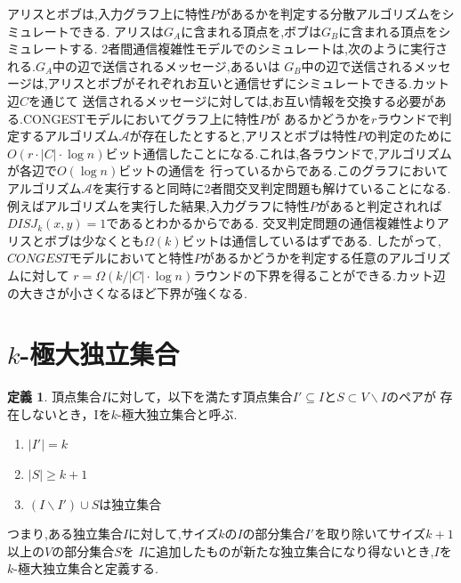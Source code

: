 \documentclass[12pt]{thesis}
\newcommand{\CONGEST}{\textsf{CONGEST}}
\theoremstyle{definition}
\newtheorem{definition}{定義}[chapter]
\begin{document}
アリスとボブは,入力グラフ上に特性$P$があるかを判定する分散アルゴリズムをシミュレートできる.
アリスは$G_{A}$に含まれる頂点を,ボブは$G_{B}$に含まれる頂点をシミュレートする.
2者間通信複雑性モデルでのシミュレートは,次のように実行される.$G_{A}$中の辺で送信されるメッセージ,あるいは
$G_{B}$中の辺で送信されるメッセージは,アリスとボブがそれぞれお互いと通信せずにシミュレートできる.カット辺$C$を通じて
送信されるメッセージに対しては,お互い情報を交換する必要がある.{\CONGEST}モデルにおいてグラフ上に特性$P$が
あるかどうかを$r$ラウンドで判定するアルゴリズム$\mathcal{A}$が存在したとすると,アリスとボブは特性$P$の判定のために
$O(r \cdot |C| \cdot \log n)$ビット通信したことになる.これは,各ラウンドで,アルゴリズムが各辺で$O(\log n)$ビットの通信を
行っているからである.このグラフにおいてアルゴリズム$\mathcal{A}$を実行すると同時に2者間交叉判定問題も解けていることになる.
例えばアルゴリズムを実行した結果,入力グラフに特性$P$があると判定されれば$DISJ_{k} (x, y)=1$であるとわかるからである.
交叉判定問題の通信複雑性よりアリスとボブは少なくとも$\Omega (k)$ビットは通信しているはずである.
したがって,$CONGEST$モデルにおいてと特性$P$があるかどうかを判定する任意のアルゴリズムに対して
$r = \Omega (k / |C| \cdot \log n)$ラウンドの下界を得ることができる.カット辺の大きさが小さくなるほど下界が強くなる.

\section{$k$-極大独立集合}

\begin{definition}
頂点集合$I$に対して，以下を満たす頂点集合$I' \subseteq I$と$S\subset V \backslash I$のペアが
存在しないとき，Iを$k$-極大独立集合と呼ぶ.
\begin{enumerate}
\item $|I'| = k$
\item $|S| \geq k + 1$
\item $(I \backslash I') \cup S$は独立集合
\end{enumerate}
\end{definition}
つまり,ある独立集合$I$に対して,サイズ$k$の$I$の部分集合$I'$を取り除いてサイズ$k + 1$以上の$V$の部分集合$S$を
$I$に追加したものが新たな独立集合になり得ないとき,$I$を$k$-極大独立集合と定義する.
\end{document}
